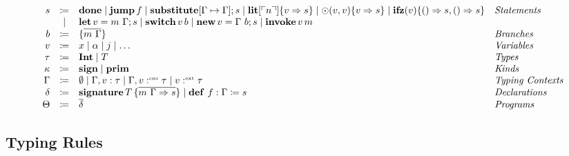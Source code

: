 
\begin{definition}
    \[ 
      \begin{array}{r c l l}
        s & \coloneqq & \mathbf{done}  \mid \mathbf{jump}\, f \mid \mathbf{substitute}[\Gamma \mapsto \Gamma]; s \mid \mathbf{lit}[\ulcorner n \urcorner]\{ v \Rightarrow s \} \mid \odot(v, v)\{ v \Rightarrow s \} \mid \mathbf{ifz}(v)\{ () \Rightarrow s, () \Rightarrow s \} & \emph{Statements}\\
        & \mid & \mathbf{let}\, v = m\ \Gamma; s \mid \mathbf{switch}\, v\, b \mid \mathbf{new}\, v = \Gamma\ b; s \mid \mathbf{invoke}\, v\, m & \\
        b & \coloneqq & \{ \overline{m\ \Gamma} \} & \emph{Branches}\\
        v & \coloneqq & x \mid \alpha \mid j \mid \ldots & \emph{Variables}\\
        \tau & \coloneqq & \mathbf{Int} \mid T & \emph{Types}\\
        \kappa & \coloneqq & \mathbf{sign} \mid \mathbf{prim} & \emph{Kinds}\\
        \Gamma & \coloneqq & \emptyset \mid \Gamma, v : \tau \mid \Gamma, v :^{\text{\tiny cns}} \tau \mid v :^{\text{\tiny ext}} \tau & \emph{Typing Contexts} \\
        \delta & \coloneqq & \mathbf{signature}\, T\, \{ \overline{m\ \Gamma \Rightarrow s} \} \mid \mathbf{def}\ f : \Gamma \coloneq s & \emph{Declarations}\\
        \Theta & \coloneqq & \overline{\delta} & \emph{Programs}\\
      \end{array}
    \]
\end{definition}

\subsection{Typing Rules}
\label{subsec:axcut:typing-rules}

